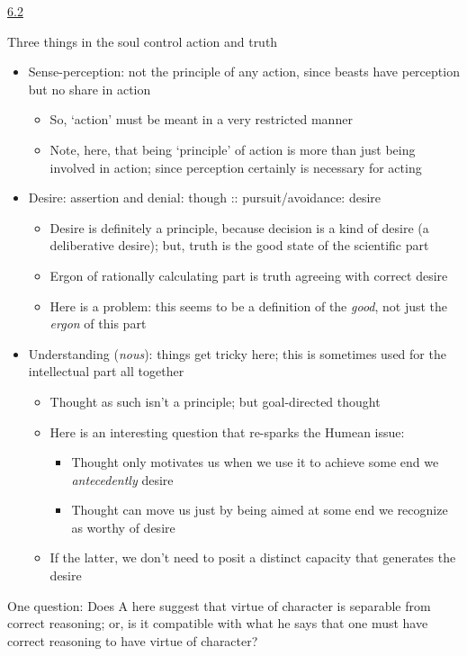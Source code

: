 \documentclass[11pt]{article}
\begin{document}
\noindent\underline{6.2}
\vspace*{4mm}

\noindent Three things in the soul control action and truth

\begin{itemize}\item{Sense-perception: not the principle of any action, since beasts have perception but no share in action}\begin{itemize}\item{So, `action' must be meant in a very restricted manner}\item{Note, here, that being `principle' of action is more than just being involved in action; since perception certainly is necessary for acting}\end{itemize}\item{Desire: assertion and denial: though :: pursuit/avoidance: desire}\begin{itemize}\item{Desire is definitely a principle, because decision is a kind of desire (a deliberative desire); but, truth is the good state of the scientific part}\item{Ergon of rationally calculating part is truth agreeing with correct desire}\item{Here is a problem: this seems to be a definition of the \emph{good}, not just the \emph{ergon} of this part}\end{itemize}\item{Understanding (\emph{nous}): things get tricky here; this is sometimes used for the intellectual part all together}\begin{itemize}\item{Thought as such isn't a principle; but goal-directed thought}\item{Here is an interesting question that re-sparks the Humean issue:}\begin{itemize}\item{Thought only motivates us when we use it to achieve some end we \emph{antecedently} desire}\item{Thought can move us just by being aimed at some end we recognize as worthy of desire}\end{itemize}\item{If the latter, we don't need to posit a distinct capacity that generates the desire}\end{itemize}\end{itemize}

\noindent One question: Does A here suggest that virtue of character is separable from correct reasoning; or, is it compatible with what he says that one must have correct reasoning to have virtue of character?
\vspace*{2mm}
\end{document}
